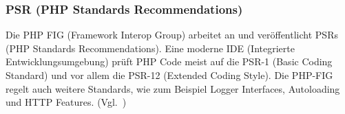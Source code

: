 \newpage

\subsubsection{PSR (PHP Standards Recommendations)}
Die PHP FIG (Framework Interop Group) arbeitet an und veröffentlicht PSRs (PHP Standards Recommendations).
Eine moderne IDE (Integrierte Entwicklungsumgebung) prüft PHP Code meist auf die PSR-1 (Basic Coding Standard) und vor allem die PSR-12 (Extended Coding Style).
Die PHP-FIG regelt auch weitere Standards, wie zum Beispiel Logger Interfaces, Autoloading und HTTP Features.
(Vgl.~\cite{psr})
